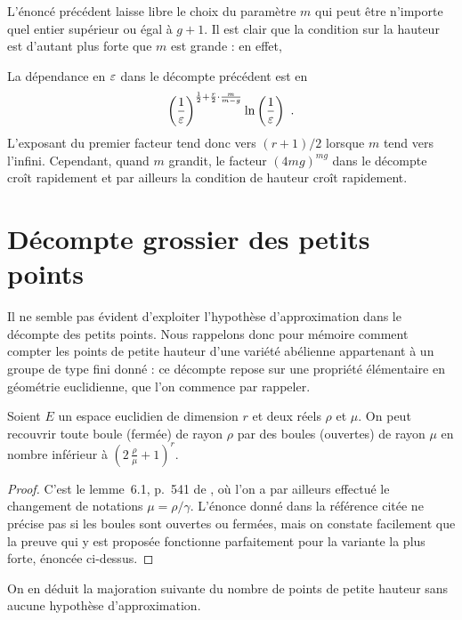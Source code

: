 L'énoncé précédent laisse libre le choix du paramètre \( m \) qui peut être
n'importe quel entier supérieur ou égal à \( g + 1 \). Il est clair que la
condition sur la hauteur est d'autant plus forte que \( m \) est grande : en
effet, 

La dépendance en \( \varepsilon \) dans le décompte précédent est en
\begin{equation}
  \left( \frac1{\varepsilon} \right)^{\frac12 + \frac r2 \cdot \frac m{m-g}}
  \ln \left( \frac1{\varepsilon} \right)
  \text{ .}
\end{equation}
L'exposant du premier facteur tend donc vers \( (r+1) / 2 \) lorsque \( m \)
tend vers l'infini. Cependant, quand \( m \) grandit, le facteur \(
  (4mg)^{mg} \) dans le décompte croît rapidement et par ailleurs la condition
de hauteur croît rapidement.



\section{Décompte grossier des petits points}
\label{sec:small-points}

Il ne semble pas évident d'exploiter l'hypothèse d'approximation dans le
décompte des petits points. Nous rappelons donc pour mémoire comment
compter les points de petite hauteur d'une variété abélienne appartenant à un
groupe de type fini donné : ce décompte repose sur une propriété élémentaire
en géométrie euclidienne, que l'on commence par rappeler.

\begin{fact}
  Soient \( E \) un espace euclidien de dimension \( r \) et deux réels \(
    \rho \) et \( \mu \). On peut recouvrir toute boule (fermée) de rayon \(
    \rho \) par des boules (ouvertes) de rayon \( \mu \) en nombre inférieur à
  \( ( 2 \, \frac\rho\mu + 1 )^r \).
\end{fact}

\begin{proof}
  C'est le lemme~6.1, p.~541 de \cite{remdcl}, où l'on a par ailleurs effectué
  le changement de notations \( \mu = \rho / \gamma \).  L'énonce donné dans
  la référence citée ne précise pas si les boules sont ouvertes ou fermées,
  mais on constate facilement que la preuve qui y est proposée fonctionne
  parfaitement pour la variante la plus forte, énoncée ci-dessus.
\end{proof}

On en déduit la majoration suivante du nombre de points de petite hauteur sans
aucune hypothèse d'approximation.

